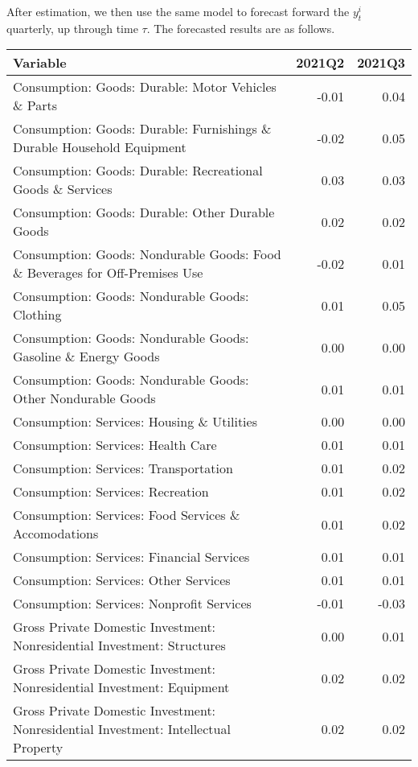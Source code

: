 \documentclass[11pt, letterpaper]{article}\usepackage[]{graphicx}\usepackage[]{color}
\begin{document}
After estimation, we then use the same model to forecast forward the $y^i_t$ quarterly, up through time $\tau$. 
The forecasted results are as follows.
\begin{table}[H]
\centering
\begingroup\scriptsize
\begin{tabular}{lrr}
  \hline
Variable & 2021Q2 & 2021Q3 \\ 
  \hline
Consumption: Goods: Durable: Motor Vehicles \& Parts & -0.01 & 0.04 \\ 
  Consumption: Goods: Durable: Furnishings \& Durable Household Equipment & -0.02 & 0.05 \\ 
  Consumption: Goods: Durable: Recreational Goods \& Services & 0.03 & 0.03 \\ 
  Consumption: Goods: Durable: Other Durable Goods & 0.02 & 0.02 \\ 
  Consumption: Goods: Nondurable Goods: Food \& Beverages for Off-Premises Use & -0.02 & 0.01 \\ 
  Consumption: Goods: Nondurable Goods: Clothing & 0.01 & 0.05 \\ 
  Consumption: Goods: Nondurable Goods: Gasoline \& Energy Goods & 0.00 & 0.00 \\ 
  Consumption: Goods: Nondurable Goods: Other Nondurable Goods & 0.01 & 0.01 \\ 
  Consumption: Services: Housing \& Utilities & 0.00 & 0.00 \\ 
  Consumption: Services: Health Care & 0.01 & 0.01 \\ 
  Consumption: Services: Transportation & 0.01 & 0.02 \\ 
  Consumption: Services: Recreation & 0.01 & 0.02 \\ 
  Consumption: Services: Food Services \& Accomodations & 0.01 & 0.02 \\ 
  Consumption: Services: Financial Services & 0.01 & 0.01 \\ 
  Consumption: Services: Other Services & 0.01 & 0.01 \\ 
  Consumption: Services: Nonprofit Services & -0.01 & -0.03 \\ 
  Gross Private Domestic Investment: Nonresidential Investment: Structures & 0.00 & 0.01 \\ 
  Gross Private Domestic Investment: Nonresidential Investment: Equipment & 0.02 & 0.02 \\ 
  Gross Private Domestic Investment: Nonresidential Investment: Intellectual Property & 0.02 & 0.02 \\ 

\end{tabular}
\end{table}
\end{document}
